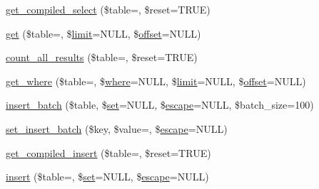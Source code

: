 \begin{DoxyCompactItemize}
\item 
\mbox{\hyperlink{class_c_i___d_b__query__builder_a23325dd8908b76e716e430b4968e3987}{get\+\_\+compiled\+\_\+select}} (\$table=\textquotesingle{}\textquotesingle{}, \$reset=T\+R\+UE)
\item 
\mbox{\hyperlink{class_c_i___d_b__query__builder_a02c629b7cdb54c95ccc23c21d910320d}{get}} (\$table=\textquotesingle{}\textquotesingle{}, \$\mbox{\hyperlink{class_c_i___d_b__query__builder_a875b0d4703f176c36e771d728a9a04a0}{limit}}=N\+U\+LL, \$\mbox{\hyperlink{class_c_i___d_b__query__builder_afd31b65425a2b5cf30711bf29e1b1851}{offset}}=N\+U\+LL)
\item 
\mbox{\hyperlink{class_c_i___d_b__query__builder_a2484516af4a0a9e1d84663d63aa7e505}{count\+\_\+all\+\_\+results}} (\$table=\textquotesingle{}\textquotesingle{}, \$reset=T\+R\+UE)
\item 
\mbox{\hyperlink{class_c_i___d_b__query__builder_a8cae750fdc32b3c91544c091673fd17b}{get\+\_\+where}} (\$table=\textquotesingle{}\textquotesingle{}, \$\mbox{\hyperlink{class_c_i___d_b__query__builder_a2356c4b7b93fb83c62a354a8a0748222}{where}}=N\+U\+LL, \$\mbox{\hyperlink{class_c_i___d_b__query__builder_a875b0d4703f176c36e771d728a9a04a0}{limit}}=N\+U\+LL, \$\mbox{\hyperlink{class_c_i___d_b__query__builder_afd31b65425a2b5cf30711bf29e1b1851}{offset}}=N\+U\+LL)
\item 
\mbox{\hyperlink{class_c_i___d_b__query__builder_ac35c8959b57eb08416e09c094371aaca}{insert\+\_\+batch}} (\$table, \$\mbox{\hyperlink{class_c_i___d_b__query__builder_a1589c46344f3a216a129cf65659b117c}{set}}=N\+U\+LL, \$\mbox{\hyperlink{class_c_i___d_b__driver_ac8f37ca5703d4558c732e692194f8cd6}{escape}}=N\+U\+LL, \$batch\+\_\+size=100)
\item 
\mbox{\hyperlink{class_c_i___d_b__query__builder_a810cdf264ad4b8df2c02c59ad3197859}{set\+\_\+insert\+\_\+batch}} (\$key, \$value=\textquotesingle{}\textquotesingle{}, \$\mbox{\hyperlink{class_c_i___d_b__driver_ac8f37ca5703d4558c732e692194f8cd6}{escape}}=N\+U\+LL)
\item 
\mbox{\hyperlink{class_c_i___d_b__query__builder_a09abce3658cfaba8d8a148c91a9be0ea}{get\+\_\+compiled\+\_\+insert}} (\$table=\textquotesingle{}\textquotesingle{}, \$reset=T\+R\+UE)
\item 
\mbox{\hyperlink{class_c_i___d_b__query__builder_a487027d8e320a1ea657af2d7e61df389}{insert}} (\$table=\textquotesingle{}\textquotesingle{}, \$\mbox{\hyperlink{class_c_i___d_b__query__builder_a1589c46344f3a216a129cf65659b117c}{set}}=N\+U\+LL, \$\mbox{\hyperlink{class_c_i___d_b__driver_ac8f37ca5703d4558c732e692194f8cd6}{escape}}=N\+U\+LL)

\end{DoxyCompactItemize}
